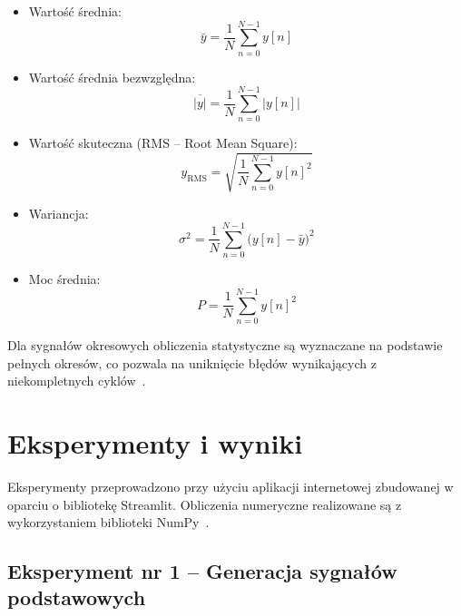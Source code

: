 \documentclass[12pt]{article}
\begin{document}
\begin{itemize}
  \item Wartość średnia:
    \begin{equation}
      \bar{y} = \frac{1}{N} \sum_{n=0}^{N-1} y[n]
      \label{eq:mean}
    \end{equation}

  \item Wartość średnia bezwzględna:
    \begin{equation}
      \overline{|y|} = \frac{1}{N} \sum_{n=0}^{N-1} |y[n]|
      \label{eq:mean_abs}
    \end{equation}

  \item Wartość skuteczna (RMS -- Root Mean Square):
    \begin{equation}
      y_{\mathrm{RMS}} = \sqrt{\frac{1}{N} \sum_{n=0}^{N-1} y[n]^2}
      \label{eq:rms}
    \end{equation}

  \item Wariancja:
    \begin{equation}
      \sigma^2 = \frac{1}{N} \sum_{n=0}^{N-1} \bigl(y[n] - \bar{y}\bigr)^2
      \label{eq:variance}
    \end{equation}

  \item Moc średnia:
    \begin{equation}
      P = \frac{1}{N} \sum_{n=0}^{N-1} y[n]^2
      \label{eq:power}
    \end{equation}
\end{itemize}

Dla sygnałów okresowych obliczenia statystyczne są wyznaczane
na podstawie pełnych okresów, co pozwala na uniknięcie błędów
wynikających z niekompletnych cyklów~\cite{lyons2011dsp}.

\section{Eksperymenty i wyniki}

Eksperymenty przeprowadzono przy użyciu aplikacji internetowej zbudowanej
w oparciu o bibliotekę Streamlit. Obliczenia numeryczne realizowane są
z wykorzystaniem biblioteki NumPy~\cite{numpy2020}.

\subsection{Eksperyment nr 1 -- Generacja sygnałów podstawowych}
\end{document}
